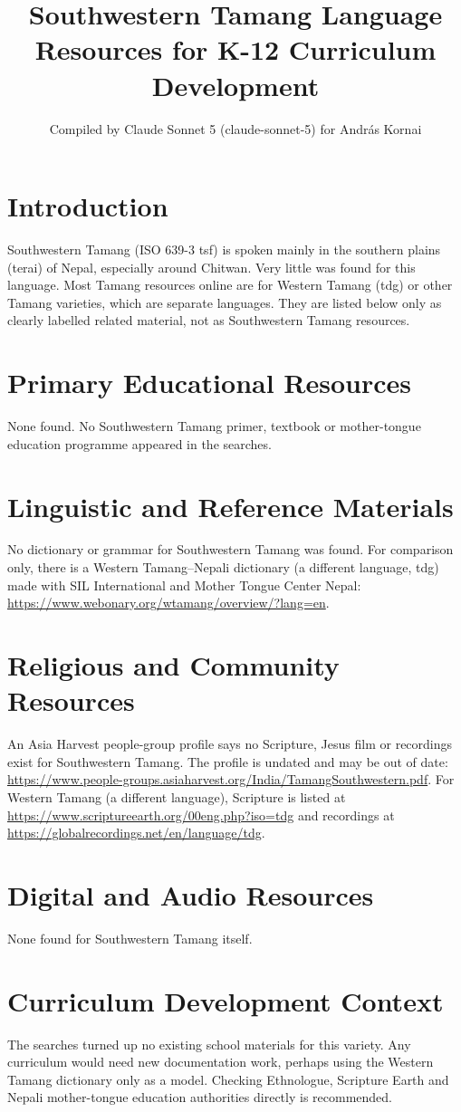 \documentclass[12pt]{article}
\title{Southwestern Tamang Language Resources for K-12 Curriculum Development}
\author{Compiled by Claude Sonnet 5 (claude-sonnet-5) for Andr\'as Kornai}
\date{}
\begin{document}
\maketitle

\section{Introduction}
Southwestern Tamang (ISO 639-3 tsf) is spoken mainly in the southern plains (terai) of Nepal, especially around Chitwan. Very little was found for this language. Most Tamang resources online are for Western Tamang (tdg) or other Tamang varieties, which are separate languages. They are listed below only as clearly labelled related material, not as Southwestern Tamang resources.

\section{Primary Educational Resources}
None found. No Southwestern Tamang primer, textbook or mother-tongue education programme appeared in the searches.

\section{Linguistic and Reference Materials}
No dictionary or grammar for Southwestern Tamang was found. For comparison only, there is a Western Tamang--Nepali dictionary (a different language, tdg) made with SIL International and Mother Tongue Center Nepal: \url{https://www.webonary.org/wtamang/overview/?lang=en}.

\section{Religious and Community Resources}
An Asia Harvest people-group profile says no Scripture, Jesus film or recordings exist for Southwestern Tamang. The profile is undated and may be out of date: \url{https://www.people-groups.asiaharvest.org/India/TamangSouthwestern.pdf}. For Western Tamang (a different language), Scripture is listed at \url{https://www.scriptureearth.org/00eng.php?iso=tdg} and recordings at \url{https://globalrecordings.net/en/language/tdg}.

\section{Digital and Audio Resources}
None found for Southwestern Tamang itself.

\section{Curriculum Development Context}
The searches turned up no existing school materials for this variety. Any curriculum would need new documentation work, perhaps using the Western Tamang dictionary only as a model. Checking Ethnologue, Scripture Earth and Nepali mother-tongue education authorities directly is recommended.
\end{document}

